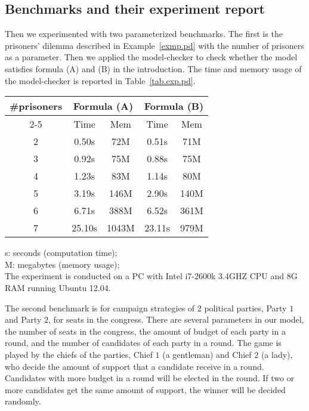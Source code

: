 \documentclass[11pt]{article}
\begin{document}
\subsection{Benchmarks and their experiment report} 

Then we experimented with two parameterized benchmarks.  
The first is the prisoners' dilemma described in Example~\ref{exmp.pd} 
with the number of prisoners as a parameter.  
Then we applied the model-checker to check whether the model  
satisfies formula (A) and (B) in the introduction.
The time and memory usage of the model-checker is reported in 
Table~\ref{tab.exp.pd}.
\begin{table*}[!th]
\caption{Experiment data for the prisoners' dilemma model}
\label{tab.exp.pd}
\begin{center}
\begin{tabular}{c||c|c||c|c} \hline
\multirow{2}{*}{\#prisoners}  &\multicolumn{2}{c||}{Formula (A)} & \multicolumn{2}{c}{Formula (B)}\\ \cline{2-5}
& Time & Mem  & Time & Mem\\ \hline
2 &0.50s &72M   &0.51s &71M \\
3 &0.92s &75M   &0.88s &75M \\
4 &1.23s &83M   &1.14s &80M \\
5 &3.19s &146M  &2.90s &140M \\
6 &6.71s &388M  &6.52s &361M \\
7 &25.10s&1043M &23.11s&979M \\ \hline
\end{tabular}
\hspace*{10mm}
\parbox{50mm}{
s: seconds (computation time); \\
M: megabytes (memory usage); \\[2mm]
The experiment is conducted on a PC with Intel i7-2600k 3.4GHZ CPU 
and 8G RAM running Ubuntu 12.04. 
}
\end{center}
\end{table*}

The second benchmark is for campaign strategies 
of 2 political parties, Party $1$ and Party $2$, for seats in 
the congress.  
There are several parameters in our model, 
the number of seats in the congress, 
the amount of budget of each party in a round, 
and the number of candidates of each party in a round. 
The game is played by the chiefs of the parties, 
Chief $1$ (a gentleman) and Chief $2$ (a lady), 
who decide the amount of support that 
a candidate receive in a round.   
Candidates with more budget in a round will be elected in the round. 
If two or more candidates get the same amount of support, 
the winner will be decided randomly.  
\end{document}
